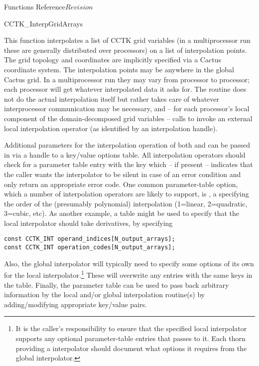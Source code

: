 \begin{cactuspart}{ Functions Reference}{}{$Revision$}
\begin{FunctionDescription}{CCTK\_InterpGridArrays}
\begin{Discussion}
This function interpolates a list of CCTK grid variables (in a multiprocessor run
these are generally distributed over processors) on a list of interpolation
points. The grid topology and coordinates are implicitly specified via a Cactus
coordinate system.
The interpolation points may be anywhere in the global Cactus grid.
In a multiprocessor run they may vary from processor to processor;
each processor will get whatever interpolated data it asks for.
The routine  does not do the actual interpolation
itself but rather takes care of whatever interprocessor communication may be
necessary, and -- for each processor's local component of the domain-decomposed grid
variables -- calls  to invoke an external
local interpolation operator (as identified by an interpolation handle).

Additional parameters for the interpolation operation of both
 and  can be
passed in via a handle to a key/value options table.
All interpolation operators should check for a parameter table entry with the
key  which -- if present -- indicates that the
caller wants the interpolator to be silent in case of an error condition and
only return an appropriate error code.
One common parameter-table option, which a number of interpolation
operators are likely to support, is , a 
specifying the order of the (presumably polynomial) interpolation
(1=linear, 2=quadratic, 3=cubic, etc).
As another example, a table might be used to specify that the local interpolator
should take derivatives, by specifying
\begin{verbatim}
const CCTK_INT operand_indices[N_output_arrays];
const CCTK_INT operation_codes[N_output_arrays];
\end{verbatim}
Also, the global interpolator will typically need to specify some options
of its own for the local interpolator.\footnote{
It is the caller's responsibility to ensure that the specified local
interpolator supports any optional parameter-table entries that
 passes to it. Each thorn providing a
 interpolator should document what options it
requires from the global interpolator.
}
These will overwrite any entries
with the same keys in the  table.
Finally, the parameter table can be used to pass back arbitrary information
by the local and/or global interpolation routine(s) by adding/modifying
appropriate key/value pairs.


\end{Discussion}
\end{FunctionDescription}
\end{cactuspart}
